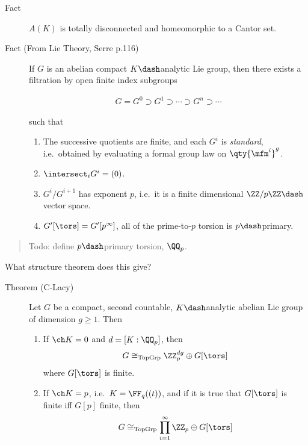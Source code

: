 \begin{description}
\item[Fact]
\(A(K)\) is totally disconnected and homeomorphic to a Cantor set.
\item[Fact (From Lie Theory, Serre p.116)]
If \(G\) is an abelian compact \(K\dash\)analytic Lie group, then there
exists a filtration by open finite index subgroups

\begin{align*}
G = G^0 \supset G^1 \supset \cdots \supset G^n \supset \cdots
\end{align*}

such that

\begin{enumerate}
\def\labelenumi{\arabic{enumi}.}
\item
  The successive quotients are finite, and each \(G^i\) is
  \emph{standard}, i.e.~obtained by evaluating a formal group law on
  \(\qty{\mfm^i}^g\).
\item
  \(\intersect_i G^i = (0)\).
\item
  \(G^i / G^{i+1}\) has exponent \(p\), i.e.~it is a finite dimensional
  \(\ZZ/p\ZZ\dash\)vector space.
\item
  \(G'[\tors] = G'[p^\infty]\), all of the prime-to-\(p\) torsion is
  \(p\dash\)primary.
\end{enumerate}
\end{description}

\begin{quote}
Todo: define \(p\dash\)primary torsion, \(\QQ_p\).
\end{quote}

What structure theorem does this give?

\begin{description}
\item[Theorem (C-Lacy)]
Let \(G\) be a compact, second countable, \(K\dash\)analytic abelian Lie
group of dimension \(g\geq 1\). Then

\begin{enumerate}
\def\labelenumi{\alph{enumi}.}
\item
  If \(\ch K = 0\) and \(d = [K: \QQ_p]\), then
  \begin{align*}
  G \cong_{\text{TopGrp}} \ZZ_p^{dg} \oplus G[\tors]
  \end{align*} where \(G[\tors]\) is finite.
\item
  If \(\ch K = p\), i.e.~\(K = \FF_q((t))\), and if it is true that
  \(G[\tors]\) is finite iff \(G[p]\) finite, then
  \begin{align*}
  G \cong_{\text{TopGrp}} \prod_{i=1}^\infty \ZZ_p \oplus G[\tors]
  \end{align*}
\end{enumerate}
\end{description}

